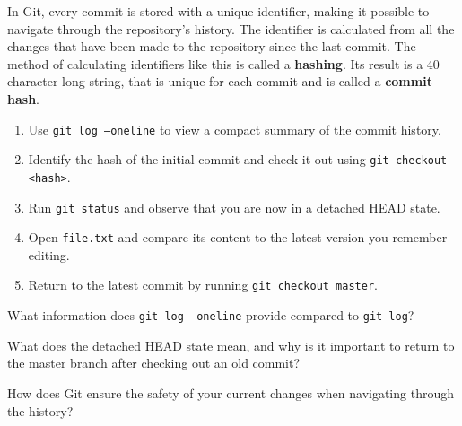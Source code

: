\begin{challenge}
    \begin{task}
        In Git, every commit is stored with a unique identifier, making it possible to navigate through the repository's history.
        The identifier is calculated from all the changes that have been made to the repository since the last commit.
        The method of calculating identifiers like this is called a \textbf{hashing}.
        Its result is a 40 character long string, that is unique for each commit and is called a \textbf{commit hash}.
        \begin{enumerate}
            \item Use \texttt{git log --oneline} to view a compact summary of the commit history.
            \item Identify the hash of the initial commit and check it out using \texttt{git checkout <hash>}.
            \item Run \texttt{git status} and observe that you are now in a detached HEAD state.
            \item Open \texttt{file.txt} and compare its content to the latest version you remember editing.
            \item Return to the latest commit by running \texttt{git checkout master}.
        \end{enumerate}

        \begin{questions}
            \item What information does \texttt{git log --oneline} provide compared to \texttt{git log}?
            \item What does the detached HEAD state mean, and why is it important to return to the master branch after checking out an old commit?
            \item How does Git ensure the safety of your current changes when navigating through the history?
        \end{questions}
    \end{task}


\end{challenge}

